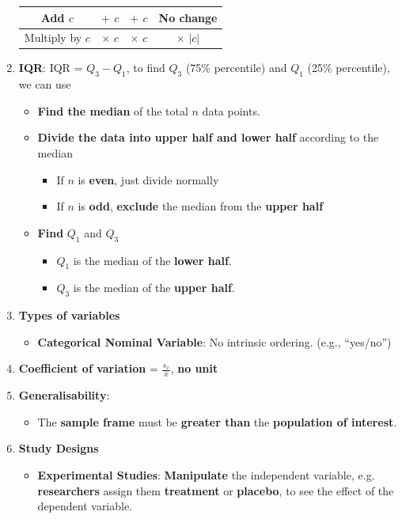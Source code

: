 \documentclass[10pt, landscape]{article}
\begin{document}
\begin{multicols}{4}
\begin{enumerate}
\begin{tabular}{|c|c|c|c|}
        Add $c$ & $+$ $c$ & $+$ $c$ & No change \\ \hline
        Multiply by $c$ & $\times$ $c$ & $\times$ $c$ & $\times$ $|c|$ \\ \hline
    \end{tabular}
    \item \textbf{IQR}: IQR = $Q_3-Q_1$, to find $Q_3$ (75\% percentile) and $Q_1$ (25\% percentile), we can use
    \begin{itemize}
        \item \textbf{Find the median} of the total $n$ data points.
        \item \textbf{Divide the data into upper half and lower half} according to the median
        \begin{itemize}
            \item If $n$ is \textbf{even}, just divide normally
            \item If $n$ is \textbf{odd}, \textbf{exclude} the median from the \textbf{upper half}
        \end{itemize}
        \item \textbf{Find} $Q_1$ and $Q_3$
        \begin{itemize}
            \item $Q_1$ is the median of the \textbf{lower half}.
            \item $Q_3$ is the median of the \textbf{upper half}.
        \end{itemize}
    \end{itemize}
    \item \textbf{Types of variables}
    \begin{itemize}
        \item \textbf{Categorical Nominal Variable}: No intrinsic ordering. (e.g., ``yes/no'')
    \end{itemize}
    \item \textbf{Coefficient of variation} = $\frac{s_x}{\bar{x}}$, \textbf{no unit}
    \item \textbf{Generalisability}:
    \begin{itemize}
        \item The \textbf{sample frame} must be \textbf{greater than} the \textbf{population of interest}.
    \end{itemize}
    \item \textbf{Study Designs}
    \begin{itemize}
        \item \textbf{Experimental Studies}: \textbf{Manipulate} the independent variable, e.g. \textbf{researchers} assign them \textbf{treatment} or \textbf{placebo}, to see the effect of the dependent variable. 

\end{itemize}
\end{enumerate}
\end{multicols}
\end{document}
